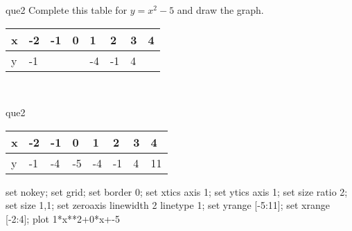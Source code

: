 \documentclass[13.5pt, varwidth=true]{beamer}
\begin{document}
\begin{frame}[shrink=19,fragile]
	\begin{beamercolorbox}[rounded=true, left, shadow=true,wd=14.8cm]{que2}
		 Complete this table for $y = x^{2} - 5$ and draw the graph. \\[0.3cm] \renewcommand{\arraystretch}{1.2}\begin{tabular}{|C|C|C|C|C|C|C|C|} \hline x & -2 & -1 & 0 & 1 & 2 & 3 & 4 \\ \hline y & -1 &  &  & -4 & -1 & 4 & \\ \hline \end{tabular}\\[0.3cm]
	\end{beamercolorbox}
\end{frame}
\begin{frame}[shrink=19,fragile]
	\begin{beamercolorbox}[rounded=true, left, shadow=true,wd=14.8cm]{que2}
		\renewcommand{\arraystretch}{1.2}\begin{tabular}{|C|C|C|C|C|C|C|C|} \hline x & -2 & -1 & 0 & 1 & 2 & 3 & 4 \\ \hline y & -1 & -4 & -5 & -4 & -1 & 4 & 11\\ \hline \end{tabular}\begin{gnuplot}[terminal=pdf] set nokey; set grid; set border 0; set xtics axis 1; set ytics axis 1; set size ratio 2; set size 1,1; set zeroaxis linewidth 2 linetype 1; set yrange [-5:11]; set xrange [-2:4]; plot 1*x**2+0*x+-5 \end{gnuplot}
	\end{beamercolorbox}
\end{frame}
\end{document}
